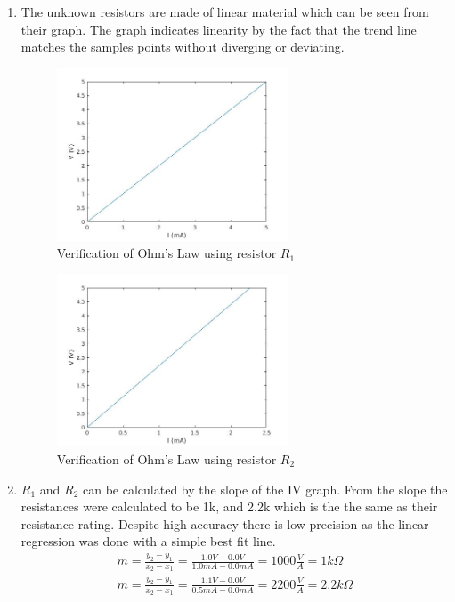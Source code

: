 \documentclass{article}
\begin{document}
\begin{enumerate}
  \item The unknown resistors are made of linear material which can be seen from their graph.
  The graph indicates linearity by the fact that the trend line matches the
  samples points without diverging or deviating.
    \begin{figure}[!ht]
  \centering
  \caption{Verification of Ohm's Law using resistor $R_1$\label{fig:plot1}}
  \includegraphics[width=0.65\textwidth]{img/plot1.jpg}
  \end{figure}

    \begin{figure}[!ht]
  \centering
  \caption{Verification of Ohm's Law using resistor $R_2$\label{fig:plot2}}
  \includegraphics[width=0.65\textwidth]{img/plot2.jpg}
  \end{figure}

  \item $R_1$ and $R_2$ can be calculated by the slope of the IV graph.
  From the slope the resistances were calculated to be 1k, and 2.2k which is the
  the same as their resistance rating. Despite high accuracy there is low precision as
  the linear regression was done with a simple best fit line.
  \begin{gather}
    m = \frac{y_2-y_1}{x_2-x_1} = \frac{1.0 V - 0.0 V}{1.0 mA - 0.0 mA} = 1000 \frac{V}{A} = 1 k \Omega \\
    m = \frac{y_2-y_1}{x_2-x_1} = \frac{1.1 V - 0.0 V}{0.5 mA - 0.0 mA} = 2200 \frac{V}{A} = 2.2 k \Omega
  \end{gather}
\end{enumerate}
\vspace{1cm}
\end{document}
